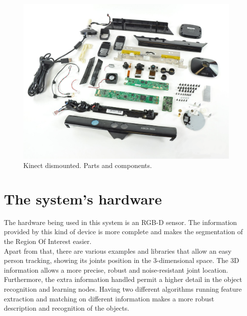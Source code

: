 \begin{figure}[h]
	\begin{center}
	\includegraphics[scale=0.2]{img/kinect/kinect_parts.eps}
	\caption[Kinect Parts]{Kinect dismounted. Parts and components.}
	\end{center}

\end{figure}


\section{The system's hardware}

The hardware being used in this system is an RGB-D sensor. The information provided by this kind of device is more complete and makes the segmentation of the Region Of Interest easier. 
\\

Apart from that, there are various examples and libraries that allow an easy person tracking, showing its joints position in the 3-dimensional space. The 3D information allows a more precise, robust and noise-resistant joint location.
\\

Furthermore, the extra information handled permit a higher detail in the object recognition and learning nodes. Having two different algorithms running feature extraction and matching on different information makes a more robust description and recognition of the objects. 

